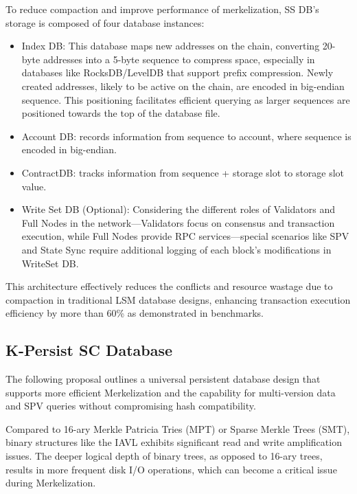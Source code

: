 To reduce compaction and improve performance of merkelization, SS DB's storage is composed of four database instances:

\begin{itemize}
    \item Index DB: This database maps new addresses on the chain, converting 20-byte addresses into a 5-byte sequence to compress space, especially in databases like RocksDB/LevelDB that support prefix compression. Newly created addresses, likely to be active on the chain, are encoded in big-endian sequence. This positioning facilitates efficient querying as larger sequences are positioned towards the top of the database file.
    \item Account DB: records information from sequence to account, where sequence is encoded in big-endian.
    \item ContractDB: tracks information from sequence + storage slot to storage slot value.
    \item Write Set DB (Optional): Considering the different roles of Validators and Full Nodes in the network—Validators focus on consensus and transaction execution, while Full Nodes provide RPC services—special scenarios like SPV and State Sync require additional logging of each block's modifications in WriteSet DB.
\end{itemize}

This architecture effectively reduces the conflicts and resource wastage due to compaction in traditional LSM database designs, enhancing transaction execution efficiency by more than 60\% as demonstrated in benchmarks.

\subsection{K-Persist SC Database}

The following proposal outlines a universal persistent database design that supports more efficient Merkelization and the capability for multi-version data and SPV queries without compromising hash compatibility. 

Compared to 16-ary Merkle Patricia Tries (MPT) or Sparse Merkle Trees (SMT), binary structures like the IAVL exhibits significant read and write amplification issues. The deeper logical depth of binary trees, as opposed to 16-ary trees, results in more frequent disk I/O operations, which can become a critical issue during Merkelization.


